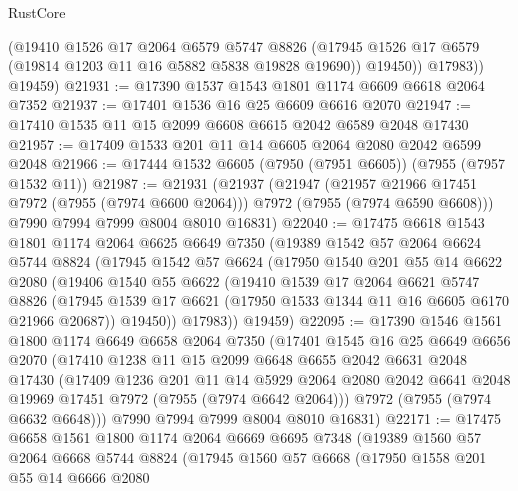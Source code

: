 \begin{lexlean}{RustCore}
\begin{coremodule}
            (@19410
              @1526
              @17
              @2064
              @6579
              @5747
              @8826
              (@17945 @1526 @17 @6579 (@19814 @1203 @11 @16 @5882 @5838 @19828 @19690))
              @19450))
          @17983))
      @19459)
@21931 := @17390 @1537 @1543 @1801 @1174 @6609 @6618 @2064 @7352
@21937 := @17401 @1536 @16 @25 @6609 @6616 @2070
@21947 := @17410 @1535 @11 @15 @2099 @6608 @6615 @2042 @6589 @2048 @17430
@21957 := @17409 @1533 @201 @11 @14 @6605 @2064 @2080 @2042 @6599 @2048
@21966 := @17444 @1532 @6605 (@7950 (@7951 @6605)) (@7955 (@7957 @1532 @11))
@21987 := @21931
    (@21937
      (@21947
        (@21957 @21966 @17451 @7972 (@7955 (@7974 @6600 @2064)))
        @7972
        (@7955 (@7974 @6590 @6608)))
      @7990
      @7994
      @7999
      @8004
      @8010
      @16831)
@22040 := @17475
    @6618
    @1543
    @1801
    @1174
    @2064
    @6625
    @6649
    @7350
    (@19389
      @1542
      @57
      @2064
      @6624
      @5744
      @8824
      (@17945
        @1542
        @57
        @6624
        (@17950
          @1540
          @201
          @55
          @14
          @6622
          @2080
          (@19406
            @1540
            @55
            @6622
            (@19410
              @1539
              @17
              @2064
              @6621
              @5747
              @8826
              (@17945 @1539 @17 @6621 (@17950 @1533 @1344 @11 @16 @6605 @6170 @21966 @20687))
              @19450))
          @17983))
      @19459)
@22095 := @17390
    @1546
    @1561
    @1800
    @1174
    @6649
    @6658
    @2064
    @7350
    (@17401
      @1545
      @16
      @25
      @6649
      @6656
      @2070
      (@17410
        @1238
        @11
        @15
        @2099
        @6648
        @6655
        @2042
        @6631
        @2048
        @17430
        (@17409
          @1236
          @201
          @11
          @14
          @5929
          @2064
          @2080
          @2042
          @6641
          @2048
          @19969
          @17451
          @7972
          (@7955 (@7974 @6642 @2064)))
        @7972
        (@7955 (@7974 @6632 @6648)))
      @7990
      @7994
      @7999
      @8004
      @8010
      @16831)
@22171 := @17475
    @6658
    @1561
    @1800
    @1174
    @2064
    @6669
    @6695
    @7348
    (@19389
      @1560
      @57
      @2064
      @6668
      @5744
      @8824
      (@17945
        @1560
        @57
        @6668
        (@17950
          @1558
          @201
          @55
          @14
          @6666
          @2080

\end{coremodule}
\end{lexlean}
